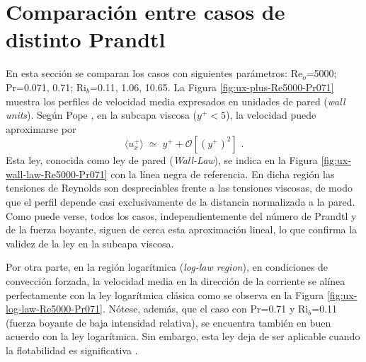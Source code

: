 \section{Comparación entre casos de distinto Prandtl}

En esta sección se comparan los casos con siguientes parámetros: Re$_o$=5000; Pr=0.071, 0.71; Ri$_b$=0.11, 1.06, 10.65. La Figura \ref{fig:ux-plus-Re5000-Pr071} muestra los perfiles de velocidad media expresados en unidades de pared (\textit{wall units}). Según Pope \cite{pope2001turbulent}, en la subcapa viscosa ($y^+ < 5$), la velocidad puede aproximarse por
$$\langle u_x^+ \rangle \;\simeq\; y^+ + \mathcal{O} \left[(y^+)^{2} \right]\text{ .}$$
Esta ley, conocida como ley de pared (\textit{Wall-Law}), se indica en la Figura \ref{fig:ux-wall-law-Re5000-Pr071} con la línea negra de referencia. En dicha región las tensiones de Reynolds son despreciables frente a las tensiones viscosas, de modo que el perfil depende casi exclusivamente de la distancia normalizada a la pared. Como puede verse, todos los casos, independientemente del número de Prandtl y de la fuerza boyante, siguen de cerca esta aproximación lineal, lo que confirma la validez de la ley en la subcapa viscosa. 

Por otra parte, en la región logarítmica (\textit{log-law region}), en condiciones de convección forzada, la velocidad media en la dirección de la corriente se alínea perfectamente con la ley logarítmica clásica \cite{kawamura2000dns} como se observa en la Figura \ref{fig:ux-log-law-Re5000-Pr071}. Nótese, además, que el caso con Pr=0.71 y Ri$_b$=0.11 (fuerza boyante de baja intensidad relativa), se encuentra también en buen acuerdo con la ley logarítmica. Sin embargo, esta ley deja de ser aplicable cuando la flotabilidad es significativa \cite{zhou2024direct}.

